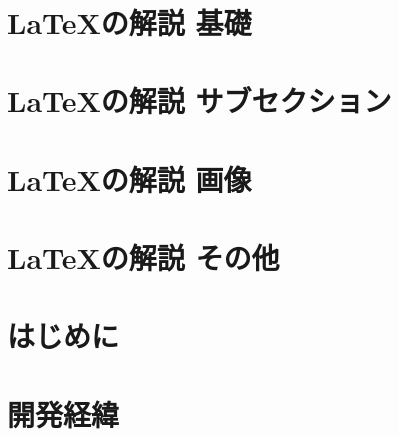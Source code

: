 \documentclass[12pt,twoside]{jsarticle}
\begin{document}
\pagestyle{plain}
\maketitle
\thispagestyle{empty}
\newpage
\thispagestyle{empty}
\ 
\newpage

\pagestyle{fancy}
\tableofcontents
\newpage



\section {LaTeXの解説 基礎}
\vspace{10pt}

\clearpage
\section {LaTeXの解説 サブセクション}
\vspace{10pt}

\clearpage
\section {LaTeXの解説 画像}
\vspace{10pt}

\clearpage
\section {LaTeXの解説 その他}
\vspace{10pt}

\clearpage

\section{はじめに}
\vspace{10pt}

\clearpage

\section{開発経緯}
\vspace{10pt}

\clearpage
\end{document}
